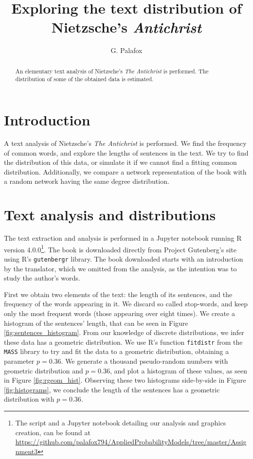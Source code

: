 \documentclass[letterpaper, 10 pt, conference]{article}
\title{Exploring the text distribution of Nietzsche's \it{Antichrist}}
\author{G. Palafox}
\begin{document}
\maketitle

\begin{abstract}
An elementary text analysis of Nietzsche's \textit{The Antichrist} \cite{antichrist} is performed. The distribution of some of the obtained data is estimated. 
\end{abstract}

\section{Introduction}
A text analysis of Nietzsche's \textit{The Antichrist} \cite{antichrist} is performed. We find the frequency of common words, and explore the lengths of sentences in the text. We try to find the distribution of this data, or simulate it if we cannot find a fitting common distribution. Additionally, we compare a network representation of the book with a random network having the same degree distribution.

\section{Text analysis and distributions}
The text extraction and analysis is performed in a Jupyter \cite{jupyter} notebook running R \cite{R} version 4.0.0\footnote{The script and a Jupyter \cite{jupyter} notebook detailing our analysis and graphics creation, can be found at \url{https://github.com/palafox794/AppliedProbabilityModels/tree/master/Assignment3}}. The book is downloaded directly from Project Gutenberg's site using R's \texttt{gutenbergr} library. The book downloaded starts with an introduction by the translator, which we omitted from the analysis, as the intention was to study the author's words.

First we obtain two elements of the text: the length of its sentences, and the frequency of the words appearing in it. We discard so called stop-words, and keep only the most frequent words (those appearing over eight times).  We create a histogram of the sentences' length, that can be seen in Figure \ref{fig:sentences_histogram}. From our knowledge of discrete distributions, we infer these data has a geometric distribution. We use R's function \texttt{fitdistr} from the \texttt{MASS} library to try and fit the data to a geometric distribution, obtaining a parameter $p = 0.36$. We generate a thousand pseudo-random numbers with geometric distribution and $p = 0.36$, and plot a histogram of these values, as seen in Figure \ref{fig:rgeom_hist}. Observing these two histograms side-by-side in Figure \ref{fig:histograms}, we conclude the length of the sentences has a geometric distribution with $p=0.36$.
\end{document}

